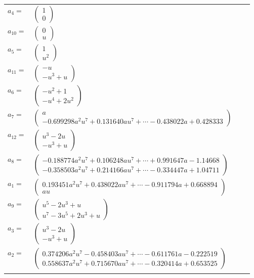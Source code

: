 \documentclass[1p]{elsarticle_modified}
\theoremstyle{definition}
\begin{document}
\begin{tabular}{m{7pt} m{180pt} m{7pt} m{180pt} }
\flushright $a_{4}=$&$\begin{pmatrix}1\\0\end{pmatrix}$ \\
\flushright $a_{10}=$&$\begin{pmatrix}0\\u\end{pmatrix}$ \\
\flushright $a_{5}=$&$\begin{pmatrix}1\\u^2\end{pmatrix}$ \\
\flushright $a_{11}=$&$\begin{pmatrix}- u\\- u^3+u\end{pmatrix}$ \\
\flushright $a_{6}=$&$\begin{pmatrix}- u^2+1\\- u^4+2 u^2\end{pmatrix}$ \\
\flushright $a_{7}=$&$\begin{pmatrix}a\\-0.699298 a^{2} u^{7}+0.131640 a u^{7}+\cdots-0.438022 a+0.428333\end{pmatrix}$ \\
\flushright $a_{12}=$&$\begin{pmatrix}u^3-2 u\\- u^3+u\end{pmatrix}$ \\
\flushright $a_{8}=$&$\begin{pmatrix}-0.188774 a^{2} u^{7}+0.106248 a u^{7}+\cdots+0.991647 a-1.14668\\-0.358503 a^{2} u^{7}+0.214166 a u^{7}+\cdots-0.334447 a+1.04711\end{pmatrix}$ \\
\flushright $a_{1}=$&$\begin{pmatrix}0.193451 a^{2} u^{7}+0.438022 a u^{7}+\cdots-0.911794 a+0.668894\\a u\end{pmatrix}$ \\
\flushright $a_{9}=$&$\begin{pmatrix}u^5-2 u^3+u\\u^7-3 u^5+2 u^3+u\end{pmatrix}$ \\
\flushright $a_{3}=$&$\begin{pmatrix}u^3-2 u\\- u^3+u\end{pmatrix}$ \\
\flushright $a_{2}=$&$\begin{pmatrix}0.374206 a^{2} u^{7}-0.458403 a u^{7}+\cdots-0.611761 a-0.222519\\0.558637 a^{2} u^{7}+0.715670 a u^{7}+\cdots-0.320414 a+0.653525\end{pmatrix}$\\&\end{tabular}
\end{document}
